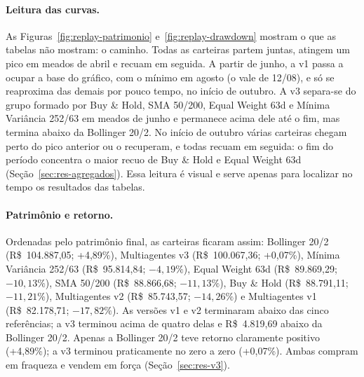 





\paragraph*{Leitura das curvas.} As Figuras~\ref{fig:replay-patrimonio} e~\ref{fig:replay-drawdown} mostram o que as tabelas não mostram: o caminho. Todas as carteiras partem juntas, atingem um pico em meados de abril e recuam em seguida. A partir de junho, a v1 passa a ocupar a base do gráfico, com o mínimo em agosto (o vale de 12/08), e só se reaproxima das demais por pouco tempo, no início de outubro. A v3 separa-se do grupo formado por Buy \& Hold, SMA 50/200, Equal Weight 63d e Mínima Variância 252/63 em meados de junho e permanece acima dele até o fim, mas termina abaixo da Bollinger 20/2. No início de outubro várias carteiras chegam perto do pico anterior ou o recuperam, e todas recuam em seguida: o fim do período concentra o maior recuo de Buy \& Hold e Equal Weight 63d (Seção~\ref{sec:res-agregados}). Essa leitura é visual e serve apenas para localizar no tempo os resultados das tabelas.

\paragraph*{Patrimônio e retorno.} Ordenadas pelo patrimônio final, as carteiras ficaram assim: Bollinger 20/2 (R\$~104.887,05; +4,89\%), Multiagentes v3 (R\$~100.067,36; +0,07\%), Mínima Variância 252/63 (R\$~95.814,84; $-4{,}19\%$), Equal Weight 63d (R\$~89.869,29; $-10{,}13\%$), SMA 50/200 (R\$~88.866,68; $-11{,}13\%$), Buy \& Hold (R\$~88.791,11; $-11{,}21\%$), Multiagentes v2 (R\$~85.743,57; $-14{,}26\%$) e Multiagentes v1 (R\$~82.178,71; $-17{,}82\%$). As versões v1 e v2 terminaram abaixo das cinco referências; a v3 terminou acima de quatro delas e R\$~4.819,69 abaixo da Bollinger 20/2. Apenas a Bollinger 20/2 teve retorno claramente positivo (+4,89\%); a v3 terminou praticamente no zero a zero (+0,07\%). Ambas compram em fraqueza e vendem em força (Seção~\ref{sec:res-v3}).

